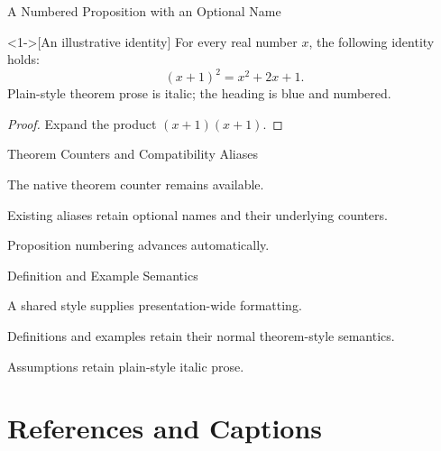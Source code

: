 \documentclass[\DesignTestOptions,xcolor={svgnames}]{beamer}
\begin{document}
\begin{frame}{A Numbered Proposition with an Optional Name}
  \begin{proposition}<1->[An illustrative identity]
    For every real number $x$, the following identity holds:
    \begin{equation}\label{eq:identity}
      (x+1)^2=x^2+2x+1.
    \end{equation}
    Plain-style theorem prose is italic; the heading is blue and numbered.
  \end{proposition}
  \begin{proof}
    Expand the product $(x+1)(x+1)$.
  \end{proof}
\end{frame}

\begin{frame}{Theorem Counters and Compatibility Aliases}
  \begin{theorem}
    The native theorem counter remains available.
  \end{theorem}
  \begin{Lemma}
    Existing aliases retain optional names and their underlying counters.
  \end{Lemma}
  \begin{proposition}
    Proposition numbering advances automatically.
  \end{proposition}
\end{frame}

\begin{frame}{Definition and Example Semantics}
  \begin{definition}
    A shared style supplies presentation-wide formatting.
  \end{definition}
  \begin{example}
    Definitions and examples retain their normal theorem-style semantics.
  \end{example}
  \begin{assumption}
    Assumptions retain plain-style italic prose.
  \end{assumption}
\end{frame}

\section{References and Captions}
\end{document}
